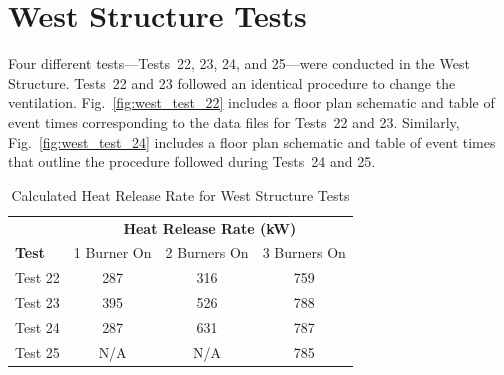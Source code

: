 \documentclass[12pt,oneside]{book}
\begin{document}
\section{West Structure Tests}
\label{sec:west_procedure}
Four different tests---Tests~22, 23, 24, and 25---were conducted in the West Structure. Tests~22 and 23 followed an identical procedure to change the ventilation. Fig.~\ref{fig:west_test_22} includes a floor plan schematic and table of event times corresponding to the data files for Tests~22 and 23. Similarly, Fig.~\ref{fig:west_test_24} includes a floor plan schematic and table of event times that outline the procedure followed during Tests~24 and 25.

\begin{table}[!ht]
\caption{Calculated Heat Release Rate for West Structure Tests}
\begin{tabular}{lccc}
 \toprule
 					& 	\multicolumn{3}{c}{\textbf{Heat Release Rate (kW)}} \\
\textbf{Test} 		& 	1 Burner On 	& 	2 Burners On 	& 	3 Burners On \\
 \midrule
Test 22				& 	  287		 	&      316			&     	759 	  \\
Test 23				& 	  395		 	&      526			&     	788 	  \\
Test 24				& 	  287		 	&      631			&     	787 	  \\
Test 25				& 	  N/A		 	&      N/A			&     	785 	  \\
\bottomrule
\end{tabular}
\label{table:HRR_West}
\end{table}
\end{document}
